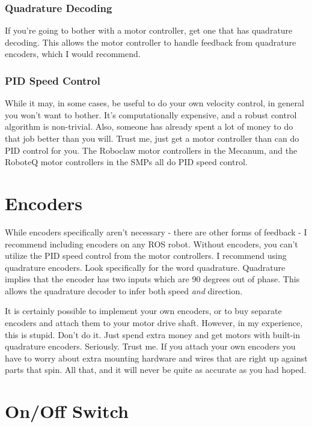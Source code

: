 \subsubsection{Quadrature Decoding}

If you're going to bother with a motor controller, get one that has quadrature decoding. This allows the motor controller to handle feedback from quadrature encoders, which I would recommend.

\subsubsection{PID Speed Control}

While it may, in some cases, be useful to do your own velocity control, in general you won't want to bother. It's computationally expensive, and a robust control algorithm is non-trivial. Also, someone has already spent a lot of money to do that job better than you will. Trust me, just get a motor controller than can do PID control for you. The Roboclaw motor controllers in the Mecanum, and the RoboteQ motor controllers in the SMPs all do PID speed control.

\section{Encoders}

While encoders specifically aren't necessary - there are other forms of feedback - I recommend including encoders on any ROS robot. Without encoders, you can't utilize the PID speed control from the motor controllers. I recommend using quadrature encoders. Look specifically for the word quadrature. Quadrature implies that the encoder has two inputs which are 90 degrees out of phase. This allows the quadrature decoder to infer both speed \textit{and} direction.

It is certainly possible to implement your own encoders, or to buy separate encoders and attach them to your motor drive shaft. However, in my experience, this is stupid. Don't do it. Just spend extra money and get motors with built-in quadrature encoders. Seriously. Trust me. If you attach your own encoders you have to worry about extra mounting hardware and wires that are right up against parts that spin. All that, and it will never be quite as accurate as you had hoped.

\section{On/Off Switch}

